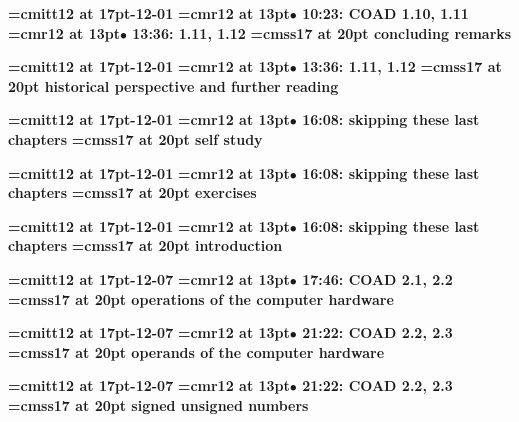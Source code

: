 {\medskip\noindent\bf\font\titlefont=cmitt12 at 17pt-12-01}\medskip
{\smallskip\noindent\bf\font\titlefont=cmr12 at 13pt\titlefont $\bullet$ 10:23: COAD 1.10, 1.11}\smallskip
{\smallskip\noindent\bf\font\titlefont=cmr12 at 13pt\titlefont $\bullet$ 13:36: 1.11, 1.12}\smallskip
{}
{\medskip\noindent\bf\font\titlefont=cmss17 at 20pt concluding remarks}\medskip

{\medskip\noindent\bf\font\titlefont=cmitt12 at 17pt-12-01}\medskip
{\smallskip\noindent\bf\font\titlefont=cmr12 at 13pt\titlefont $\bullet$ 13:36: 1.11, 1.12}\smallskip
{}
{\medskip\noindent\bf\font\titlefont=cmss17 at 20pt historical perspective and further reading}\medskip

{\medskip\noindent\bf\font\titlefont=cmitt12 at 17pt-12-01}\medskip
{\smallskip\noindent\bf\font\titlefont=cmr12 at 13pt\titlefont $\bullet$ 16:08: skipping these last chapters}\smallskip
{}
{\medskip\noindent\bf\font\titlefont=cmss17 at 20pt self study}\medskip

{\medskip\noindent\bf\font\titlefont=cmitt12 at 17pt-12-01}\medskip
{\smallskip\noindent\bf\font\titlefont=cmr12 at 13pt\titlefont $\bullet$ 16:08: skipping these last chapters}\smallskip
{}
{\medskip\noindent\bf\font\titlefont=cmss17 at 20pt exercises}\medskip

{\medskip\noindent\bf\font\titlefont=cmitt12 at 17pt-12-01}\medskip
{\smallskip\noindent\bf\font\titlefont=cmr12 at 13pt\titlefont $\bullet$ 16:08: skipping these last chapters}\smallskip
{}
{\medskip\noindent\bf\font\titlefont=cmss17 at 20pt introduction}\medskip

{\medskip\noindent\bf\font\titlefont=cmitt12 at 17pt-12-07}\medskip
{\smallskip\noindent\bf\font\titlefont=cmr12 at 13pt\titlefont $\bullet$ 17:46: COAD 2.1, 2.2}\smallskip
{}
{\medskip\noindent\bf\font\titlefont=cmss17 at 20pt operations of the computer hardware}\medskip

{\medskip\noindent\bf\font\titlefont=cmitt12 at 17pt-12-07}\medskip
{\smallskip\noindent\bf\font\titlefont=cmr12 at 13pt\titlefont $\bullet$ 21:22: COAD 2.2, 2.3}\smallskip
{}
{\medskip\noindent\bf\font\titlefont=cmss17 at 20pt operands of the computer hardware}\medskip

{\medskip\noindent\bf\font\titlefont=cmitt12 at 17pt-12-07}\medskip
{\smallskip\noindent\bf\font\titlefont=cmr12 at 13pt\titlefont $\bullet$ 21:22: COAD 2.2, 2.3}\smallskip
{}
{\medskip\noindent\bf\font\titlefont=cmss17 at 20pt signed unsigned numbers}\medskip

